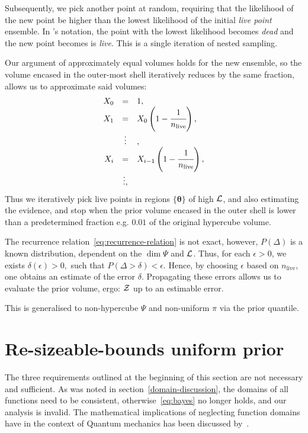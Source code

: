 \documentclass[usenatbib]{mnras}
\begin{document}
Subsequently, we pick another point at random, requiring that the
likelihood of the new point be higher than the lowest likelihood of
the initial \emph{live point} ensemble. In \citeauthor{Skilling2006}'s
notation, the point with the lowest likelihood becomes \emph{dead} and
the new point becomes is \emph{live}. This is a single iteration of
nested sampling.

Our argument of approximately equal volumes holds for the new
ensemble, so the volume encased in the outer-most shell iteratively
reduces by the same fraction, allows us to approximate said volumes:
\begin{equation}\label{eq:recurrence-relation}
  \begin{array}{rcl}
  X_{0} &=  &1, \\
  X_{1} &= &X_{0} \left(1- \cfrac{1}{n_\text{live}}\right),\\
  & \vdots &, \\
  X_{i} &= &X_{i-1}\left(1- \cfrac{1}{n_\text{live}}\right),\\
  & \vdots, &
\end{array}
\end{equation}
Thus we iteratively pick live points in regions $\{\bm{\theta}\}$ of
high \({\cal L}\), and also estimating the evidence, and stop when the
prior volume encased in the outer shell is lower than a predetermined
fraction e.g. \(0.01\) of the original hypercube volume.

The recurrence relation~\eqref{eq:recurrence-relation} is not exact,
however, \(P(\Delta)\) is a known distribution, dependent on the
\(\dim \Psi\) and \({\cal L}\). Thus, for each \(\epsilon>0\), we
exists
\(\delta(\epsilon) >0,\) such that \(P(\Delta > \delta)<\epsilon.\)
Hence, by choosing \(\epsilon\) based on \(n_\text{live}\), one
obtains an estimate of the error \(\delta\). Propagating these errors
allows us to evaluate the prior volume, ergo: ${\cal Z}$ up to an
estimable error.

This is generalised to non-hypercube $\Psi$ and non-uniform $\pi$ via
the prior quantile.

\section{Re-sizeable-bounds uniform prior}\label{sec:resizeable}

The three requirements outlined at the beginning of this section are
not necessary and sufficient. As was noted in
section~\vref{domain-discussion}, the domains of all functions need to
be consistent, otherwise~\vref{eq:bayes} no longer holds, and our
analysis is invalid. The mathematical implications of neglecting
function domains have in the context of Quantum mechanics has been
discussed by~\cite{Gieres_2000}.
\end{document}
